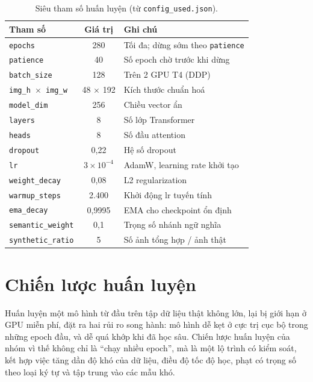 \documentclass[12pt,a4paper]{report}
\begin{document}
\begin{table}[H]
\centering
\caption{Siêu tham số huấn luyện (từ \texttt{config\_used.json}).}
\label{tab:hp}
\begin{tabular}{lcl}
\toprule
\textbf{Tham số} & \textbf{Giá trị} & \textbf{Ghi chú} \\
\midrule
\texttt{epochs} & 280 & Tối đa; dừng sớm theo \texttt{patience} \\
\texttt{patience} & 40 & Số epoch chờ trước khi dừng \\
\texttt{batch\_size} & 128 & Trên 2 GPU T4 (DDP) \\
\texttt{img\_h $\times$ img\_w} & 48 $\times$ 192 & Kích thước chuẩn hoá \\
\texttt{model\_dim} & 256 & Chiều vector ẩn \\
\texttt{layers} & 8 & Số lớp Transformer \\
\texttt{heads} & 8 & Số đầu attention \\
\texttt{dropout} & 0,22 & Hệ số dropout \\
\texttt{lr} & $3\times10^{-4}$ & AdamW, learning rate khởi tạo \\
\texttt{weight\_decay} & 0,08 & L2 regularization \\
\texttt{warmup\_steps} & 2.400 & Khởi động lr tuyến tính \\
\texttt{ema\_decay} & 0,9995 & EMA cho checkpoint ổn định \\
\texttt{semantic\_weight} & 0,1 & Trọng số nhánh ngữ nghĩa \\
\texttt{synthetic\_ratio} & 5 & Số ảnh tổng hợp / ảnh thật \\
\bottomrule
\end{tabular}
\end{table}

\chapter{Chiến lược huấn luyện}

Huấn luyện một mô hình từ đầu trên tập dữ liệu thật không lớn, lại bị giới hạn ở GPU miễn phí, đặt ra hai rủi ro song hành: mô hình dễ kẹt ở cực trị cục bộ trong những epoch đầu, và dễ quá khớp khi đã học sâu. Chiến lược huấn luyện của nhóm vì thế không chỉ là ``chạy nhiều epoch'', mà là một lộ trình có kiểm soát, kết hợp việc tăng dần độ khó của dữ liệu, điều độ tốc độ học, phạt có trọng số theo loại ký tự và tập trung vào các mẫu khó.
\end{document}
